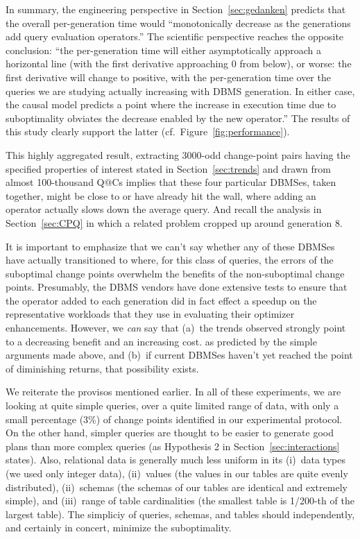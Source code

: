\documentclass[prodmode,acmtods]{acmsmall}
\begin{document}
In summary, the engineering perspective in Section~\ref{sec:gedanken}
predicts that the overall per-generation time would ``monotonically decrease
as the generations add query evaluation operators.'' The scientific
perspective reaches the opposite conclusion: ``the
per-generation time will either asymptotically approach a horizontal line
(with the first derivative approaching 0 from below), or worse: the first
derivative will change to positive, with the per-generation time over the
queries we are studying actually increasing with \hbox{DBMS}
generation. In either case, the causal model predicts a point where the
\hbox{increase} in execution time due to suboptimality obviates the decrease
enabled by the new operator.'' The results of this study clearly support
the latter (cf.~Figure~\ref{fig:performance}).

This highly aggregated result, extracting 3000-odd change-point pairs having
the specified properties of interest stated in Section~\ref{sec:trends} and
drawn from almost \hbox{100-thousand} Q@Cs implies that these four
particular \hbox{DBMSes}, taken together, might be close to or have already
hit the wall, where adding an operator actually slows down the average
query. And recall the analysis in Section~\ref{sec:CPQ} in which a
related problem cropped up around generation 8.

It is important to emphasize that we can't say whether any of these DBMSes have actually
transitioned to where, for this class of queries, the errors of the
suboptimal change points overwhelm the benefits of the non-suboptimal change
points. Presumably, the DBMS vendors have done extensive tests to ensure
that the operator added to each generation did in fact effect a speedup on
the representative workloads that they use in evaluating their optimizer
enhancements. However, we {\em can} say that (a)~the trends observed
strongly point to a decreasing benefit and an increasing cost. as predicted
by the simple arguments made above, and (b)~if current DBMSes haven't yet
reached the point of diminishing returns, that possibility exists.

We reiterate the provisos mentioned earlier. In all of these
experiments, we are looking at quite simple queries, over a quite limited
range of data, with only a small percentage (3\%) of change points
identified in our experimental protocol. On the other hand, simpler queries
are thought to be easier to generate good plans than more complex queries
(as Hypothesis 2 in Section~\ref{sec:interactions} states). Also, relational
data is generally much less uniform in its (i)~data types (we used only
integer data), (ii)~values (the values in our tables are quite evenly
distributed), (ii)~schemas (the schemas of our tables are identical and
extremely simple), and (iii)~range of table cardinalities (the smallest
table is 1/200-th of the largest table). The simpliciy of queries, schemas,
and tables should independently, and certainly in concert, minimize the
suboptimality.
\end{document}
